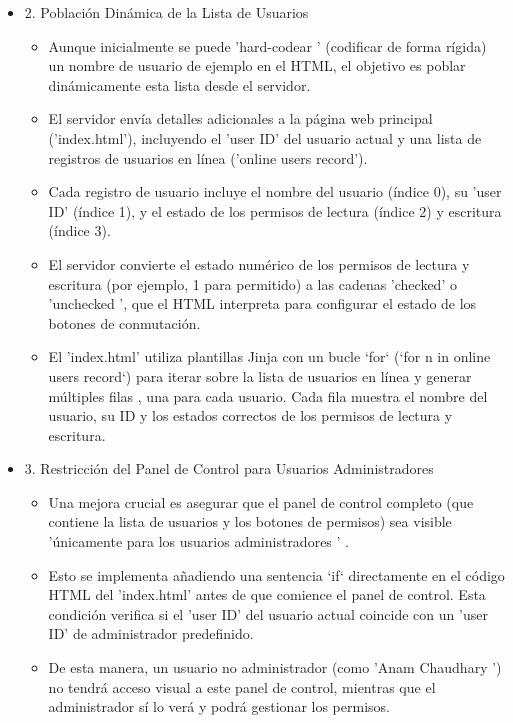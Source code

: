 \documentclass{report}
\begin{document}
\begin{itemize}
    \item 2. Población Dinámica de la Lista de Usuarios
    \begin{itemize}
        \item Aunque inicialmente se puede  'hard-codear ' (codificar de forma rígida) un nombre de usuario de ejemplo en el HTML, el objetivo es  
        poblar dinámicamente esta lista  desde el servidor.
        \item El servidor envía detalles adicionales a la página web principal ('index.html'), incluyendo el 'user ID' del usuario actual y una  
        lista de registros de usuarios en línea  ('online users record').
        \item Cada registro de usuario incluye el nombre del usuario (índice 0), su 'user ID' (índice 1), y el estado de los permisos de lectura 
        (índice 2) y escritura (índice 3).
        \item El servidor convierte el estado numérico de los permisos de lectura y escritura (por ejemplo, 1 para permitido) a las cadenas 
        'checked' o  'unchecked ', que el HTML interpreta para configurar el estado de los botones de conmutación.
        \item El 'index.html' utiliza  plantillas Jinja  con un  bucle `for` (`for n in online users record`)  para iterar sobre la lista de 
        usuarios en línea y generar  múltiples filas , una para cada usuario. Cada fila muestra el nombre del usuario, su ID y los estados correctos 
        de los permisos de lectura y escritura.
    \end{itemize}

    \item 3. Restricción del Panel de Control para Usuarios Administradores
    \begin{itemize}
        \item Una mejora crucial es asegurar que  el panel de control completo (que contiene la lista de usuarios y los botones de permisos) 
        sea visible  'únicamente para los usuarios administradores ' .
        \item Esto se implementa añadiendo una  sentencia `if` directamente en el código HTML  del 'index.html' antes de que comience el panel 
        de control. Esta condición verifica si el 'user ID' del usuario actual coincide con un 'user ID' de administrador predefinido.
        \item De esta manera, un  usuario no administrador  (como  'Anam Chaudhary ') no tendrá acceso visual a este panel de control, mientras 
        que el administrador sí lo verá y podrá gestionar los permisos.
    \end{itemize}


\end{itemize}
\end{document}
